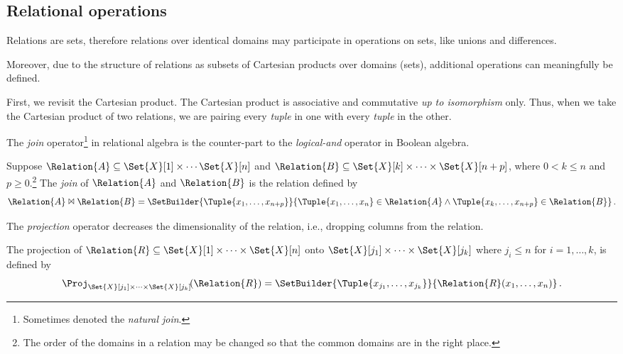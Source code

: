 \documentclass[ ../main.tex]{subfiles}
\begin{document}
\subsection{Relational operations}
Relations are sets, therefore relations over identical domains may participate in operations on sets, like unions and differences.

Moreover, due to the structure of relations as subsets of Cartesian products over domains (sets), additional operations can meaningfully be defined.

First, we revisit the Cartesian product. The Cartesian product is associative and commutative \emph{up to isomorphism} only. Thus, when we take the Cartesian product of two relations, we are pairing every \emph{tuple} in one with every \emph{tuple} in the other.



The \emph{join} operator\footnote{Sometimes denoted the \emph{natural join}.} in relational algebra is the counter-part to the \emph{logical-and} operator in Boolean algebra.
\begin{definition}
Suppose $\Relation{A} \subseteq \Set{X}[1] \times \cdots \Set{X}[n]$ and $\Relation{B} \subseteq \Set{X}[k] \times \cdots \times \Set{X}[n+p]$, where $0 < k \leq n$ and $p \geq 0$.\footnote{The order of the domains in a relation may be changed so that the common domains are in the right place.} The \emph{join} of $\Relation{A}$ and $\Relation{B}$ is the relation defined by
\begin{equation}
    \Relation{A} \Join \Relation{B} = \SetBuilder{ \Tuple{x_1,\ldots,x_{n+p}} }{ \Tuple{x_1,\ldots,x_n} \in \Relation{A} \land \Tuple{x_k,\ldots,x_{n+p}} \in \Relation{B}}\,.
\end{equation}
\end{definition}

The \emph{projection} operator decreases the dimensionality of the relation, i.e., dropping columns from the relation.
\begin{definition}
The projection of $\Relation{R} \subseteq \Set{X}[1] \times \cdots \times \Set{X}[n]$ onto $\Set{X}[j_1] \times \cdots \times \Set{X}[j_k]$ where $j_i \leq n$ for $i=1,\ldots,k$, is defined by
\begin{equation}
   \Proj_{\Set{X}[j_1] \times \cdots \times \Set{X}[j_k]}\!(\Relation{R}) = \SetBuilder
   {\Tuple{x_{j_1},\ldots,x_{j_k}}}{\Relation{R}(x_1,\ldots,x_n)}\,.
\end{equation}
\end{definition}
\end{document}
